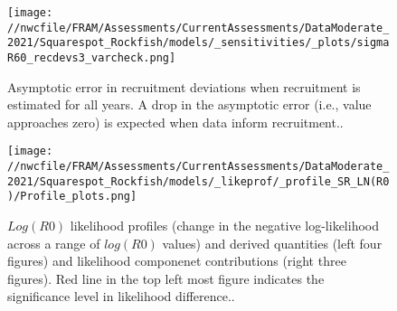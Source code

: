 \documentclass[11pt,
  english,
  a4paper,
]{article}
\begin{document}
\tagmcend\tagstructend


\begin{figure}
\centering
\texttt{[image: //nwcfile/FRAM/Assessments/CurrentAssessments/DataModerate\_2021/Squarespot\_Rockfish/models/\_sensitivities/\_plots/sigmaR60\_recdevs3\_varcheck.png]}
\caption{Asymptotic error in recruitment deviations when recruitment is estimated for all years. A drop in the asymptotic error (i.e., value approaches zero) is expected when data inform recruitment..\label{fig:rec-mod-var}}
\end{figure}

\tagmcend\tagstructend


\begin{figure}
\centering
\texttt{[image: //nwcfile/FRAM/Assessments/CurrentAssessments/DataModerate\_2021/Squarespot\_Rockfish/models/\_likeprof/\_profile\_SR\_LN(R0)/Profile\_plots.png]}
\caption{{\(Log(R0)\)\leavevmode\tagmcend\tagstructend} likelihood profiles (change in the negative log-likelihood across a range of {\(log(R0)\)\leavevmode\tagmcend\tagstructend} values) and derived quantities (left four figures) and likelihood componenet contributions (right three figures). Red line in the top left most figure indicates the significance level in likelihood difference..\label{fig:r0-profile-combo}}
\end{figure}

\tagmcend\tagstructend

\end{document}

